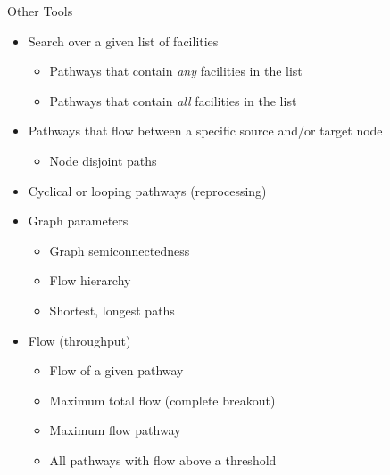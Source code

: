 \begin{frame}{Other Tools}
    \begin{itemize}
        \item Search over a given list of facilities
        \begin{itemize}
            \item Pathways that contain \textit{any} facilities in the list
            \item Pathways that contain \textit{all} facilities in the list
        \end{itemize}
        \item Pathways that flow between a specific source and/or target node        \begin{itemize}
            \item Node disjoint paths
        \end{itemize}
        \item Cyclical or looping pathways (reprocessing)
        \item Graph parameters
        \begin{itemize}
            \item Graph semiconnectedness
            \item Flow hierarchy
            \item Shortest, longest paths
        \end{itemize}
        \item Flow (throughput)
        \begin{itemize}
            \item Flow of a given pathway
            \item Maximum total flow (complete breakout)
            \item Maximum flow pathway
            \item All pathways with flow above a threshold
        \end{itemize}
    \end{itemize}
\end{frame}

